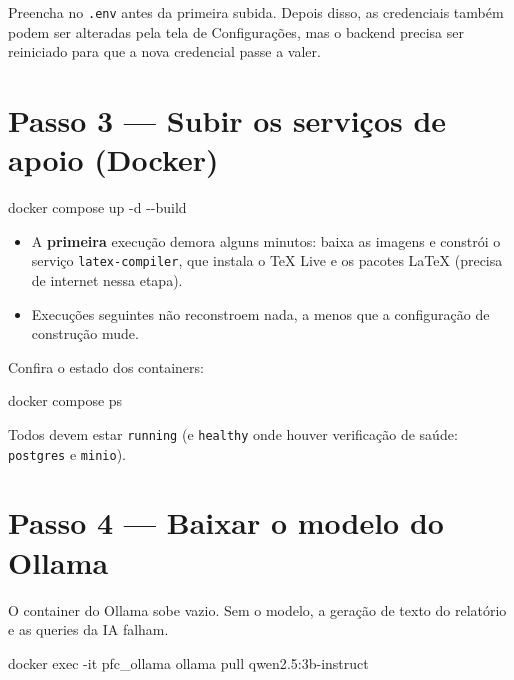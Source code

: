 \documentclass[
  brazilian,
  a4paper,12pt,oneside]{report}
\newenvironment{Shaded}{}{}
\newcommand{\DecValTok}[1]{\textcolor[rgb]{0.25,0.63,0.44}{#1}}
\newcommand{\FunctionTok}[1]{\textcolor[rgb]{0.02,0.16,0.49}{#1}}
\newcommand{\NormalTok}[1]{#1}
\newcommand{\OperatorTok}[1]{\textcolor[rgb]{0.40,0.40,0.40}{#1}}
\providecommand{\tightlist}{%
  \setlength{\itemsep}{0pt}\setlength{\parskip}{0pt}}
\begin{document}
Preencha no \texttt{.}\allowbreak{}\texttt{env} antes da primeira
subida. Depois disso, as credenciais também podem ser alteradas pela
tela de Configurações, mas o backend precisa ser reiniciado para que a
nova credencial passe a valer.

\section{Passo 3 --- Subir os serviços de apoio
(Docker)}\label{passo-3-subir-os-serviuxe7os-de-apoio-docker}

\begin{Shaded}
\begin{Highlighting}[]
\NormalTok{docker compose up }\OperatorTok{{-}}\NormalTok{d }\OperatorTok{{-}{-}}\NormalTok{build}
\end{Highlighting}
\end{Shaded}

\begin{itemize}
\tightlist
\item
  A \textbf{primeira} execução demora alguns minutos: baixa as imagens e
  constrói o serviço \texttt{latex-}\allowbreak{}\texttt{compiler}, que
  instala o TeX Live e os pacotes LaTeX (precisa de internet nessa
  etapa).
\item
  Execuções seguintes não reconstroem nada, a menos que a configuração
  de construção mude.
\end{itemize}

Confira o estado dos containers:

\begin{Shaded}
\begin{Highlighting}[]
\NormalTok{docker compose }\FunctionTok{ps}
\end{Highlighting}
\end{Shaded}

Todos devem estar \texttt{running} (e \texttt{healthy} onde houver
verificação de saúde: \texttt{postgres} e \texttt{minio}).

\section{Passo 4 --- Baixar o modelo do
Ollama}\label{passo-4-baixar-o-modelo-do-ollama}

O container do Ollama sobe vazio. Sem o modelo, a geração de texto do
relatório e as queries da IA falham.

\begin{Shaded}
\begin{Highlighting}[]
\NormalTok{docker exec }\OperatorTok{{-}}\NormalTok{it pfc\_ollama ollama pull qwen2}\OperatorTok{.}\DecValTok{5}\OperatorTok{:}\NormalTok{3b{-}instruct}
\end{Highlighting}
\end{Shaded}
\end{document}
